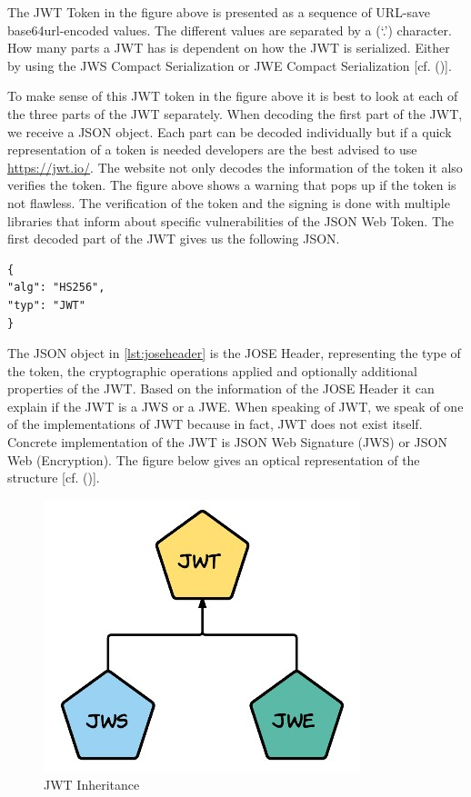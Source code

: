 {The JWT Token in the figure above is presented as a sequence of URL-save base64url-encoded values. The different values are separated by a (‘.’) character. How many parts a JWT has is dependent on how the JWT is serialized. Either by using the JWS Compact Serialization or JWE Compact Serialization  [cf. (\cite{JWT:IETF:Jones:2015})].


To make sense of this JWT token in the figure above it is best to look at each of the three parts of the JWT separately. When decoding the first part of the JWT, we receive a JSON object. Each part can be decoded individually but if a quick representation of a token is needed developers are the best advised to use \href{https://jwt.io/} {https://jwt.io/}. The website not only decodes the information of the token it also verifies the token. The figure above shows a warning that pops up if the token is not flawless. The verification of the token and the signing is done with multiple libraries that inform about specific vulnerabilities of the JSON Web Token. The first decoded part of the JWT gives us the following JSON.


\begin{lstlisting}
{
"alg": "HS256",
"typ": "JWT"
}
\end{lstlisting}


The JSON object in \ref{lst:joseheader} is the JOSE Header, representing the type of the token, the cryptographic operations applied and optionally additional properties of the JWT. Based on the information of the JOSE Header it can explain if the JWT is a JWS or a JWE. When speaking of JWT, we speak of one of the implementations of JWT because in fact, JWT does not exist itself. Concrete implementation of the JWT is JSON Web Signature (JWS) or JSON Web (Encryption). The figure below gives an optical representation of the structure [cf. (\cite{Siriwardena:JWTJWSJWE:2016})].


\begin{figure}[h]
	\centering
	\includegraphics[width=0.6\linewidth]{images/jwtjwsjwe}
	\caption[JWT Inheritence]{JWT Inheritance}
	\label{fig:jwtjwsjwe}
\end{figure}

}
